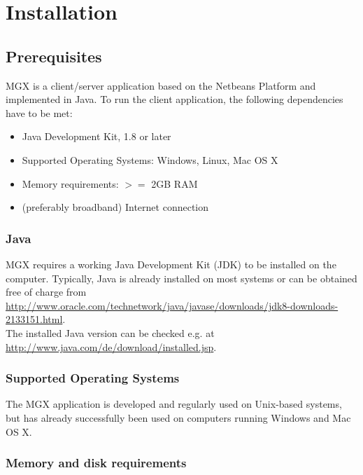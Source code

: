 
\chapter{Installation}
\label{installation}

\section{Prerequisites}

MGX is a client/server application based on the Netbeans Platform and implemented
in Java. To run the client application, the following dependencies have to be
met:

\begin{itemize}
  \item{Java Development Kit, 1.8 or later}
  \item{Supported Operating Systems: Windows, Linux, Mac OS X}
  \item{Memory requirements: $>=$ 2GB RAM}
  \item{(preferably broadband) Internet connection}
\end{itemize}

\subsection{Java}

MGX requires a working Java Development Kit (JDK) to be installed on the computer. Typically,
Java is already installed on most systems or can be obtained free of charge from\\

\url{http://www.oracle.com/technetwork/java/javase/downloads/jdk8-downloads-2133151.html}.\\

The installed Java version can be checked e.g. at\\

\url{http://www.java.com/de/download/installed.jsp}.

\subsection{Supported Operating Systems}

The MGX application is developed and regularly used on Unix-based systems,
but has already successfully been used on computers running Windows and
Mac OS X.

\subsection{Memory and disk requirements}

